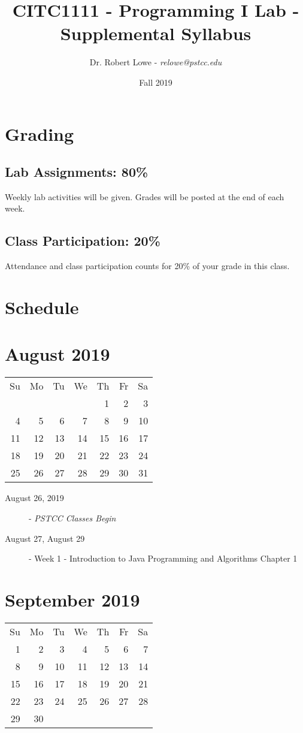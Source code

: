 \documentclass{article}
\title{CITC1111 - Programming I Lab - Supplemental Syllabus}
\author{Dr. Robert Lowe - {\em relowe@pstcc.edu}}
\date{Fall 2019}
\begin{document}
\maketitle

\section{Grading}
\subsection*{Lab Assignments: 80\%}
Weekly lab activities will be given. Grades will be posted at the end
of each week.

\subsection*{Class Participation: 20\%}
Attendance and class participation counts for 20\% of your grade in
this class.

\section{Schedule}
\section*{August 2019}
\begin{tabular}{rrrrrrr}
Su & Mo & Tu & We & Th & Fr & Sa\\
   &    &    &    &  1 &  2 &  3\\
 4 &  5 &  6 &  7 &  8 &  9 & 10\\
11 & 12 & 13 & 14 & 15 & 16 & 17\\
18 & 19 & 20 & 21 & 22 & 23 & 24\\
25 & 26 & 27 & 28 & 29 & 30 & 31\\
\end{tabular}

\begin{description}
    \item[August 26, 2019] - {\em PSTCC Classes Begin}
    \item[August 27, August 29] - Week 1 - Introduction to Java Programming and Algorithms
        \newline Chapter 1
\end{description}

\hrulefill

\section*{September 2019}
\begin{tabular}{rrrrrrr}
Su & Mo & Tu & We & Th & Fr & Sa\\
 1 &  2 &  3 &  4 &  5 &  6 & 7\\
 8 &  9 & 10 & 11 & 12 & 13 & 14\\
15 & 16 & 17 & 18 & 19 & 20 & 21\\
22 & 23 & 24 & 25 & 26 & 27 & 28\\
29 & 30 &    &    &    &    &   \\
\end{tabular}
\end{document}
